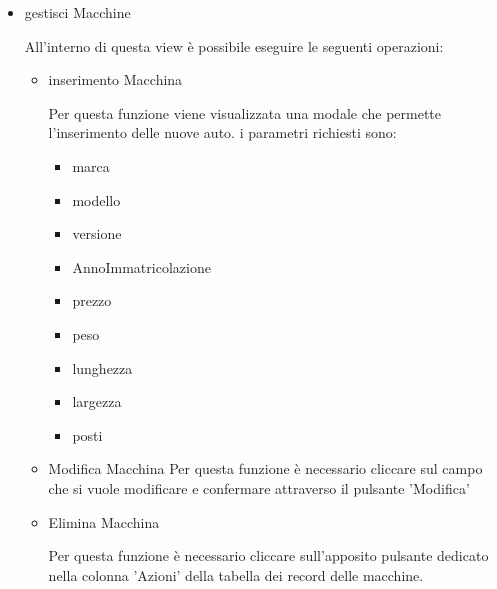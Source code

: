 \documentclass[12pt]{article}
\begin{document}
\begin{enumerate}
\begin{enumerate}
\begin{enumerate}
\begin{itemize}
      \smallskip

      \item {gestisci Macchine}  \newline
      

      All'interno di questa view è possibile eseguire le seguenti operazioni:

      \smallskip
      \begin{itemize}
        \item{inserimento Macchina} \newline
         
        \smallskip
          
        
           Per questa funzione viene visualizzata una modale che permette l'inserimento delle nuove auto.
           i parametri richiesti sono:
           \smallskip
           \begin{itemize}
           \item marca 
           \item modello
           \item versione
           \item AnnoImmatricolazione
           \item prezzo
           \item peso
           \item lunghezza
           \item largezza
           \item posti
           \end{itemize}
           \smallskip
           \smallskip
           \item{Modifica Macchina} \newline
           Per questa funzione è necessario cliccare sul campo che si vuole modificare e confermare attraverso il pulsante 'Modifica'
        \smallskip
        \newpage
        \item{Elimina Macchina} \newline
        
          \smallskip
           Per questa funzione è necessario cliccare sull'apposito pulsante dedicato nella colonna 'Azioni' della tabella dei record delle macchine.  
           
        \smallskip
        
        
      \end{itemize}
      \smallskip
      
      \end{itemize}
  \end{enumerate}

  \end{enumerate}
\end{enumerate}
\bigskip
\end{document}
